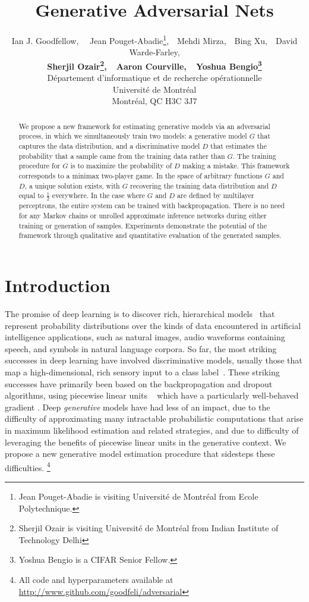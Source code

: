 \documentclass{article} %
\title{Generative Adversarial Nets}
\author{
Ian J. Goodfellow,
\ \  Jean Pouget-Abadie\thanks{Jean Pouget-Abadie is visiting Universit\'e de Montr\'eal from Ecole Polytechnique.
},\ \  Mehdi Mirza,\ \  Bing Xu,\ \ David Warde-Farley,\\
{\bf Sherjil Ozair\thanks{Sherjil Ozair is visiting Universit\'e de Montr\'eal from Indian Institute of Technology Delhi},\ \ Aaron Courville,\ \ Yoshua Bengio\thanks{Yoshua Bengio is a CIFAR Senior Fellow.}}\\
D\'epartement d'informatique et de recherche op\'erationnelle\\
Universit\'e de Montr\'eal\\
Montr\'eal, QC H3C 3J7 \\
}
\begin{document}
\maketitle

\begin{abstract}
We propose a new framework for estimating generative models
via an adversarial process, in which we simultaneously train
two models: a generative model $G$ that captures the data
distribution, and a discriminative model $D$ that estimates the
probability that a sample came from the training data rather than $G$.
The training procedure for $G$ is to maximize the probability of $D$ making
a mistake. This framework corresponds to a minimax two-player game. In the
space of arbitrary functions $G$ and $D$, a unique solution exists, with $G$
recovering the training data distribution and $D$ equal to $\frac{1}{2}$
everywhere. In the case where $G$ and $D$ are defined by multilayer perceptrons,
the entire system can be trained with backpropagation. There is no need for any Markov chains
or unrolled approximate inference networks during either training or generation
of samples. Experiments demonstrate the potential of the framework
through qualitative and quantitative evaluation of the generated
samples. 
\end{abstract}

\section{Introduction}


The promise of deep learning is to discover rich, hierarchical models~\citep{Bengio-2009-book} that represent
probability distributions over the kinds of data encountered in artificial intelligence applications,
 such as natural images, audio waveforms containing speech, and symbols in natural language corpora.
So far, the most striking successes in deep learning have involved discriminative models,
usually those that map a high-dimensional, rich sensory input to a class 
label~\citep{Hinton-et-al-2012,Krizhevsky-2012-small}. These
striking successes have primarily been based on the backpropagation and dropout algorithms, using
piecewise linear units
~\cite{Jarrett-ICCV2009,Glorot+al-AI-2011-small,Goodfellow_maxout_2013} which have a particularly well-behaved gradient
. Deep {\em generative} models have had less of an impact, due to the difficulty of approximating
many intractable probabilistic computations that arise in maximum likelihood estimation and
related strategies, and due to difficulty of leveraging the benefits of piecewise linear units in
the generative context. We propose a new generative model estimation procedure that sidesteps these difficulties.
\footnote{All code and hyperparameters available at \url{http://www.github.com/goodfeli/adversarial}}
\end{document}
